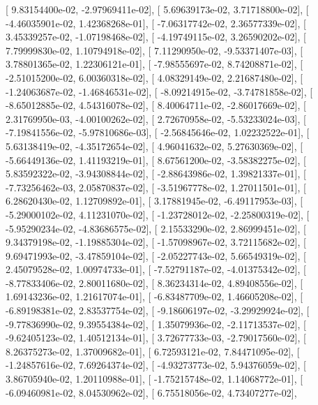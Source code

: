 \documentclass{article}
\begin{document}
       [  9.83154400e-02,  -2.97969411e-02],
       [  5.69639173e-02,   3.71718800e-02],
       [ -4.46035901e-02,   1.42368268e-01],
       [ -7.06317742e-02,   2.36577339e-02],
       [  3.45339257e-02,  -1.07198468e-02],
       [ -4.19749115e-02,   3.26590202e-02],
       [  7.79999830e-02,   1.10794918e-02],
       [  7.11290950e-02,  -9.53371407e-03],
       [  3.78801365e-02,   1.22306121e-01],
       [ -7.98555697e-02,   8.74208871e-02],
       [ -2.51015200e-02,   6.00360318e-02],
       [  4.08329149e-02,   2.21687480e-02],
       [ -1.24063687e-02,  -1.46846531e-02],
       [ -8.09214915e-02,  -3.74781858e-02],
       [ -8.65012885e-02,   4.54316078e-02],
       [  8.40064711e-02,  -2.86017669e-02],
       [  2.31769950e-03,  -4.00100262e-02],
       [  2.72670958e-02,  -5.53233024e-03],
       [ -7.19841556e-02,  -5.97810686e-03],
       [ -2.56845646e-02,   1.02232522e-01],
       [  5.63138419e-02,  -4.35172654e-02],
       [  4.96041632e-02,   5.27630369e-02],
       [ -5.66449136e-02,   1.41193219e-01],
       [  8.67561200e-02,  -3.58382275e-02],
       [  5.83592322e-02,  -3.94308844e-02],
       [ -2.88643986e-02,   1.39821337e-01],
       [ -7.73256462e-03,   2.05870837e-02],
       [ -3.51967778e-02,   1.27011501e-01],
       [  6.28620430e-02,   1.12709892e-01],
       [  3.17881945e-02,  -6.49117953e-03],
       [ -5.29000102e-02,   4.11231070e-02],
       [ -1.23728012e-02,  -2.25800319e-02],
       [ -5.95290234e-02,  -4.83686575e-02],
       [  2.15533290e-02,   2.86999451e-02],
       [  9.34379198e-02,  -1.19885304e-02],
       [ -1.57098967e-02,   3.72115682e-02],
       [  9.69471993e-02,  -3.47859104e-02],
       [ -2.05227743e-02,   5.66549319e-02],
       [  2.45079528e-02,   1.00974733e-01],
       [ -7.52791187e-02,  -4.01375342e-02],
       [ -8.77833406e-02,   2.80011680e-02],
       [  8.36234314e-02,   4.89408556e-02],
       [  1.69143236e-02,   1.21617074e-01],
       [ -6.83487709e-02,   1.46605208e-02],
       [ -6.89198381e-02,   2.83537754e-02],
       [ -9.18606197e-02,  -3.29929924e-02],
       [ -9.77836990e-02,   9.39554384e-02],
       [  1.35079936e-02,  -2.11713537e-02],
       [ -9.62405123e-02,   1.40512134e-01],
       [  3.72677733e-03,  -2.79017560e-02],
       [  8.26375273e-02,   1.37009682e-01],
       [  6.72593121e-02,   7.84471095e-02],
       [ -1.24857616e-02,   7.69264374e-02],
       [ -4.93273773e-02,   5.94376059e-02],
       [  3.86705940e-02,   1.20110988e-01],
       [ -1.75215748e-02,   1.14068772e-01],
       [ -6.09460981e-02,   8.04530962e-02],
       [  6.75518056e-02,   4.73407277e-02],
\end{document}
